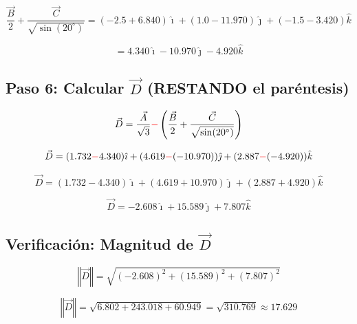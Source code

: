 \documentclass[12pt,letterpaper]{article}
\begin{document}
\begin{equation*}
\frac{\vec{B}}{2}+\frac{\vec{C}}{\sqrt{\sin(20^\circ)}} = (-2.5+6.840)\hat{\imath}+(1.0-11.970)\hat{\jmath}+(-1.5-3.420)\hat{k}
\end{equation*}

\begin{equation*}
= \boxed{4.340\hat{\imath}-10.970\hat{\jmath}-4.920\hat{k}}
\end{equation*}

\subsection*{Paso 6: Calcular $\vec{D}$ (RESTANDO el par\'entesis)}

\begin{equation*}
\vec{D} = \frac{\vec{A}}{\sqrt{3}}\textcolor{red}{-}\left( \frac{\vec{B}}{2}+\frac{\vec{C}}{\sqrt{\sin(20^\circ)}}\right)
\end{equation*}

\begin{equation*}
\vec{D} = (1.732\textcolor{red}{-}4.340)\hat{\imath}+(4.619\textcolor{red}{-}(-10.970))\hat{\jmath}+(2.887\textcolor{red}{-}(-4.920))\hat{k}
\end{equation*}

\begin{equation*}
\vec{D} = (1.732-4.340)\hat{\imath}+(4.619+10.970)\hat{\jmath}+(2.887+4.920)\hat{k}
\end{equation*}

\begin{equation*}
\boxed{\vec{D} = -2.608\hat{\imath}+15.589\hat{\jmath}+7.807\hat{k}}
\end{equation*}

\subsection*{Verificaci\'on: Magnitud de $\vec{D}$}

\begin{equation*}
\left\Vert \vec{D} \right\Vert = \sqrt{(-2.608)^2 + (15.589)^2 + (7.807)^2}
\end{equation*}

\begin{equation*}
\left\Vert \vec{D} \right\Vert = \sqrt{6.802 + 243.018 + 60.949} = \sqrt{310.769} \approx \boxed{17.629}
\end{equation*}

\end{document}
